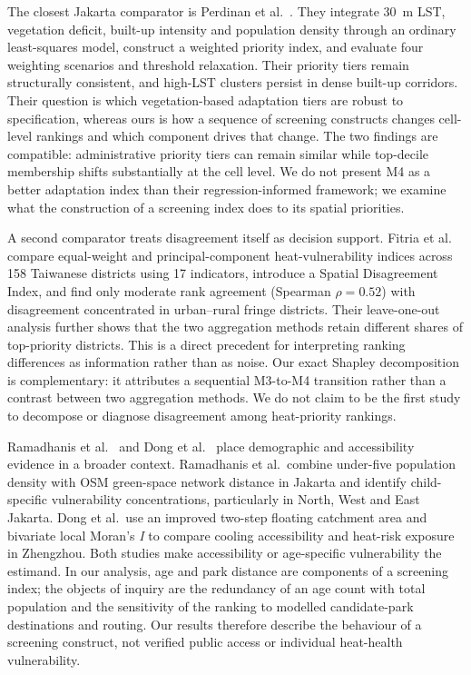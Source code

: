 \documentclass[times,twoside]{_Templates/MultiTargetManuscript}
\begin{document}
The closest Jakarta comparator is Perdinan et al.\ \citep{perdinan2026}. They
integrate 30~m LST, vegetation deficit, built-up intensity and population
density through an ordinary least-squares model, construct a weighted priority
index, and evaluate four weighting scenarios and threshold relaxation. Their
priority tiers remain structurally consistent, and high-LST clusters persist in
dense built-up corridors. Their question is which vegetation-based adaptation
tiers are robust to specification, whereas ours is how a sequence of screening
constructs changes cell-level rankings and which component drives that change.
The two findings are compatible: administrative priority tiers can remain
similar while top-decile membership shifts substantially at the cell level. We
do not present M4 as a better adaptation index than their regression-informed
framework; we examine what the construction of a screening index does to its
spatial priorities.

A second comparator treats disagreement itself as decision support. Fitria et
al.\ \citep{fitria2026} compare equal-weight and principal-component
heat-vulnerability indices across 158 Taiwanese districts using 17 indicators,
introduce a Spatial Disagreement Index, and find only moderate rank agreement
(Spearman $\rho=0.52$) with disagreement concentrated in urban--rural fringe
districts. Their leave-one-out analysis further shows that the two aggregation
methods retain different shares of top-priority districts. This is a direct
precedent for interpreting ranking differences as information rather than as
noise. Our exact Shapley decomposition is complementary: it attributes a
sequential M3-to-M4 transition rather than a contrast between two aggregation
methods. We do not claim to be the first study to decompose or diagnose
disagreement among heat-priority rankings.

Ramadhanis et al.\ \citep{ramadhanis2026} and Dong et al.\ \citep{dong2024}
place demographic and accessibility evidence in a broader context. Ramadhanis
et al.\ combine under-five population density with OSM green-space network
distance in Jakarta and identify child-specific vulnerability concentrations,
particularly in North, West and East Jakarta. Dong et al.\ use an improved
two-step floating catchment area and bivariate local Moran's \textit{I} to
compare cooling accessibility and heat-risk exposure in Zhengzhou. Both studies
make accessibility or age-specific vulnerability the estimand. In our analysis,
age and park distance are components of a screening index; the objects of
inquiry are the redundancy of an age count with total population and the
sensitivity of the ranking to modelled candidate-park destinations and routing.
Our results therefore describe the behaviour of a screening construct, not
verified public access or individual heat-health vulnerability.
\end{document}
